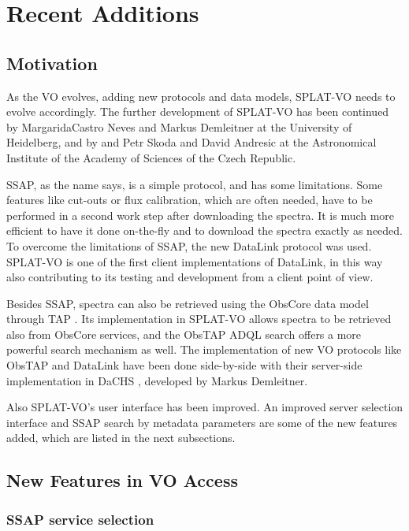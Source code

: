 \documentclass[final,authoryear,5p,times,twocolumn]{elsarticle}
\begin{document}

\section{Recent Additions}


\subsection{Motivation}

As the VO evolves, adding new protocols and data models, SPLAT-VO
needs to evolve accordingly.  The further development of SPLAT-VO has
been continued by MargaridaCastro Neves and Markus Demleitner at the
University of Heidelberg, and by and Petr Skoda and David Andresic at
the Astronomical Institute of the Academy of Sciences of the Czech
Republic.

SSAP, as the name says, is a simple protocol, and has some
limitations. Some features like cut-outs or flux calibration, which
are often needed, have to be performed in a second work step after
downloading the spectra. It is much more efficient to have it done
on-the-fly and  to download the spectra exactly as needed. To overcome
the limitations of SSAP, the new DataLink protocol \citep{datalink}
was used. SPLAT-VO is one of the first client implementations of
DataLink, in this way also contributing to its testing and development
from a client point of view.

Besides SSAP, spectra can also be retrieved using the ObsCore data model
through TAP \citep[known as ObsTap;][]{obstap}. Its implementation in
SPLAT-VO allows spectra to be retrieved also from ObsCore services, and
the ObsTAP ADQL \citep{adql} search offers a more powerful search
mechanism as well. The implementation of new VO protocols like ObsTAP
and DataLink have been done side-by-side with their server-side
implementation in DaCHS \citep[Data Center Helper Suite;][]{dachs},
developed by Markus Demleitner.

Also SPLAT-VO's user interface has been improved. An improved server
selection interface and SSAP search by metadata parameters are some of
the new features added, which are listed in the next subsections.

\subsection{New Features in VO Access}

\subsubsection{SSAP service selection}
\end{document}
